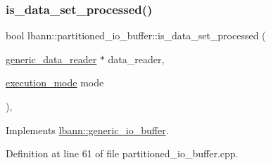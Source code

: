 \subsubsection{\texorpdfstring{is\+\_\+data\+\_\+set\+\_\+processed()}{is\_data\_set\_processed()}}
{\footnotesize\ttfamily bool lbann\+::partitioned\+\_\+io\+\_\+buffer\+::is\+\_\+data\+\_\+set\+\_\+processed (\begin{DoxyParamCaption}\item[{\hyperlink{classlbann_1_1generic__data__reader}{generic\+\_\+data\+\_\+reader} $\ast$}]{data\+\_\+reader,  }\item[{\hyperlink{base_8hpp_a2781a159088df64ed7d47cc91c4dc0a8}{execution\+\_\+mode}}]{mode }\end{DoxyParamCaption})\hspace{0.3cm}{\ttfamily [override]}, {\ttfamily [virtual]}}



Implements \hyperlink{classlbann_1_1generic__io__buffer_a9a038d40aec50dbc24c0abe21ad0c0a9}{lbann\+::generic\+\_\+io\+\_\+buffer}.



Definition at line 61 of file partitioned\+\_\+io\+\_\+buffer.\+cpp.


